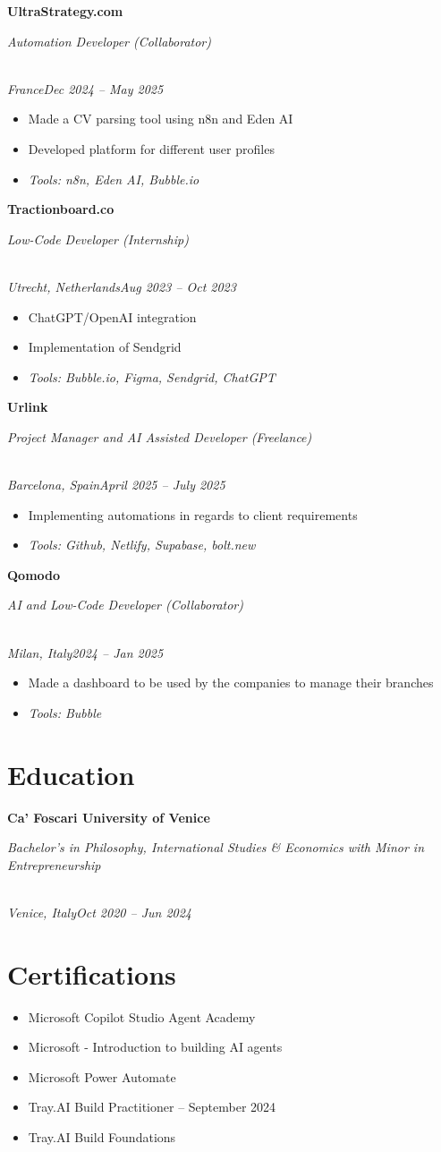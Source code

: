\documentclass[a4paper,10pt]{article}
\newcommand{\role}[4]{\vspace{3pt}\noindent\hspace{0.6em}\parbox[t]{0.38\textwidth}{\raggedright\textbf{#1}}\hfill\parbox[t]{0.58\textwidth}{\raggedleft\textit{#2}}\\{\textit{#3}\hfill\textit{#4}}\vspace{1pt}}
\begin{document}
\role{UltraStrategy.com}{Automation Developer (Collaborator)}{France}{Dec 2024 -- May 2025}
\begin{itemize}
\item Made a CV parsing tool using n8n and Eden AI
\item Developed platform for different user profiles
\item \textit{Tools: n8n, Eden AI, Bubble.io}
\end{itemize}

\role{Tractionboard.co}{Low-Code Developer (Internship)}{Utrecht, Netherlands}{Aug 2023 -- Oct 2023}
\begin{itemize}
\item ChatGPT/OpenAI integration
\item Implementation of Sendgrid
\item \textit{Tools: Bubble.io, Figma, Sendgrid, ChatGPT}
\end{itemize}

\role{Urlink}{Project Manager and AI Assisted Developer (Freelance)}{Barcelona, Spain}{April 2025 -- July 2025}
\begin{itemize}
\item Implementing automations in regards to client requirements
\item \textit{Tools: Github, Netlify, Supabase, bolt.new}
\end{itemize}

\role{Qomodo}{AI and Low-Code Developer (Collaborator)}{Milan, Italy}{2024 -- Jan 2025}
\begin{itemize}
\item Made a dashboard to be used by the companies to manage their branches
\item \textit{Tools: Bubble}
\end{itemize}

\section{Education}
\role{Ca' Foscari University of Venice}{Bachelor's in Philosophy, International Studies \& Economics with Minor in Entrepreneurship}{Venice, Italy}{Oct 2020 -- Jun 2024}

\section{Certifications}
\begin{itemize}
\item Microsoft Copilot Studio Agent Academy
\item Microsoft - Introduction to building AI agents
\item Microsoft Power Automate
\item Tray.AI Build Practitioner -- September 2024
\item Tray.AI Build Foundations
\end{itemize}
\end{document}
